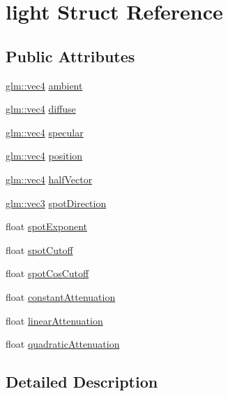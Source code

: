 \hypertarget{structlight}{}\section{light Struct Reference}
\label{structlight}
\subsection*{Public Attributes}
\begin{DoxyCompactItemize}
\item 
\hyperlink{group__core__types_ga5881b1b022d7fd1b7218f5916532dd02}{glm\+::vec4} \hyperlink{structlight_a55272e98f6354987f671e462020a114f}{ambient}
\item 
\hyperlink{group__core__types_ga5881b1b022d7fd1b7218f5916532dd02}{glm\+::vec4} \hyperlink{structlight_a3c5ae9ee6f2d72bd13b0f11f7dbc8802}{diffuse}
\item 
\hyperlink{group__core__types_ga5881b1b022d7fd1b7218f5916532dd02}{glm\+::vec4} \hyperlink{structlight_a03121f7e82d16d3b67fa0cd3efc30eb6}{specular}
\item 
\hyperlink{group__core__types_ga5881b1b022d7fd1b7218f5916532dd02}{glm\+::vec4} \hyperlink{structlight_a9cb7c5d031dcfd66ff10480aa021235a}{position}
\item 
\hyperlink{group__core__types_ga5881b1b022d7fd1b7218f5916532dd02}{glm\+::vec4} \hyperlink{structlight_af8848393784e35f096bea1a663ba1a9c}{half\+Vector}
\item 
\hyperlink{group__core__types_ga1c47e8b3386109bc992b6c48e91b0be7}{glm\+::vec3} \hyperlink{structlight_a24ba4cefe6d7757dd48be420ac70713e}{spot\+Direction}
\item 
float \hyperlink{structlight_a537f6f54361118f6211c99c26716a848}{spot\+Exponent}
\item 
float \hyperlink{structlight_ae9caaef52485008773b4169e8ca71def}{spot\+Cutoff}
\item 
float \hyperlink{structlight_a25376f0a1e32235d50ef14edfa18bfb3}{spot\+Cos\+Cutoff}
\item 
float \hyperlink{structlight_a788e3a9fbc05cd748dd6a181b6043892}{constant\+Attenuation}
\item 
float \hyperlink{structlight_aea11b1222a4d5c42f5d69e31751e6fac}{linear\+Attenuation}
\item 
float \hyperlink{structlight_afe2993ec0463d57b374b8f5a27f2dfa7}{quadratic\+Attenuation}
\end{DoxyCompactItemize}


\subsection{Detailed Description}


